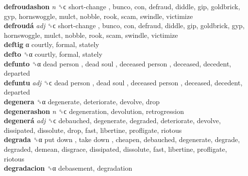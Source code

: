 \textbf{defroudashon} \emph{n}  ␝ϲ   short-change , bunco, con, defraud, diddle, gip, goldbrick, gyp, hornswoggle, mulct, nobble, rook, scam, swindle, victimize  \\
\textbf{defroudá} \emph{adj}  ␝ϲ   short-change , bunco, con, defraud, diddle, gip, goldbrick, gyp, hornswoggle, mulct, nobble, rook, scam, swindle, victimize  \\
\textbf{deftig} α  courtly, formal, stately  \\
\textbf{defto} ␝α  courtly, formal, stately  \\
\textbf{defunto} ␝α   dead person ,  dead soul ,  deceased person , deceased, decedent, departed  \\
\textbf{defuntu} \emph{adj}  ␝ϲ   dead person ,  dead soul ,  deceased person , deceased, decedent, departed  \\
\textbf{degenera} ␝α  degenerate, deteriorate, devolve, drop  \\
\textbf{degenerashon} \emph{n}  ␝ϲ  degeneration, devolution, retrogression  \\
\textbf{degenerá} \emph{adj}  ␝ϲ  debauched, degenerate, degraded, deteriorate, devolve, dissipated, dissolute, drop, fast, libertine, profligate, riotous  \\
\textbf{degrada} ␝α   put down ,  take down , cheapen, debauched, degenerate, degrade, degraded, demean, disgrace, dissipated, dissolute, fast, libertine, profligate, riotous  \\
\textbf{degradacion} ␝α  debasement, degradation  \\
